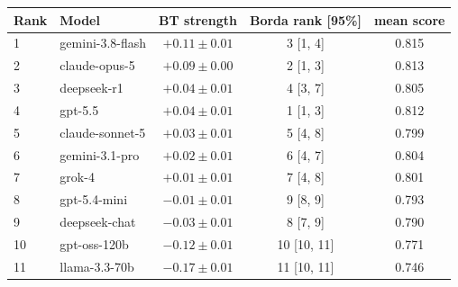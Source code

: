 \begin{tabular}{llccc}
\toprule
Rank & Model & BT strength & Borda rank [95\%] & mean score \\
\midrule
1 & gemini-3.8-flash & $+0.11 \pm 0.01$ & 3 [1, 4] & 0.815 \\
2 & claude-opus-5 & $+0.09 \pm 0.00$ & 2 [1, 3] & 0.813 \\
3 & deepseek-r1 & $+0.04 \pm 0.01$ & 4 [3, 7] & 0.805 \\
4 & gpt-5.5 & $+0.04 \pm 0.01$ & 1 [1, 3] & 0.812 \\
5 & claude-sonnet-5 & $+0.03 \pm 0.01$ & 5 [4, 8] & 0.799 \\
6 & gemini-3.1-pro & $+0.02 \pm 0.01$ & 6 [4, 7] & 0.804 \\
7 & grok-4 & $+0.01 \pm 0.01$ & 7 [4, 8] & 0.801 \\
8 & gpt-5.4-mini & $-0.01 \pm 0.01$ & 9 [8, 9] & 0.793 \\
9 & deepseek-chat & $-0.03 \pm 0.01$ & 8 [7, 9] & 0.790 \\
10 & gpt-oss-120b & $-0.12 \pm 0.01$ & 10 [10, 11] & 0.771 \\
11 & llama-3.3-70b & $-0.17 \pm 0.01$ & 11 [10, 11] & 0.746 \\
\bottomrule
\end{tabular}
